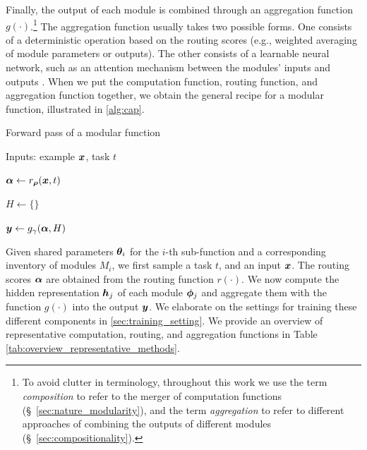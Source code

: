 \documentclass[10pt]{article} %
\begin{document}
Finally, the output of each module is combined through an aggregation function $g(\cdot)$.\footnote{To avoid clutter in terminology, throughout this work we use the term \textit{composition} to refer to the merger of computation functions (\S~\ref{sec:nature_modularity}), and the term \textit{aggregation} to refer to different approaches of combining the outputs of different modules (\S~\ref{sec:compositionality}).} The aggregation function usually takes two possible forms. One consists of a deterministic operation based on the routing scores (e.g., weighted averaging of module parameters or outputs). The other consists of a learnable neural network, such as an attention mechanism between the modules' inputs and outputs \citep{pfeiffer2020adapterfusion}. When we put the computation function, routing function, and aggregation function together, we obtain the general recipe for a modular function, illustrated in \cref{alg:cap}.

\begin{center}
\begin{minipage}{.5\linewidth}
\begin{algorithm}[H]
\caption{Forward pass of a modular function}\label{alg:cap}
Inputs: example ${\bm{x}}$, task $t$

${\bm{\alpha}} \gets r_{\bm{\rho}}({\bm{x}}, t)$ 

$H \gets \{\}$


${\bm{y}} \gets g_\gamma({\bm{\alpha}}, H)$ 

\end{algorithm}
\end{minipage}
\end{center}

Given shared parameters ${\bm{\theta}}_i$ for the $i$-th sub-function and a corresponding inventory of modules $M_i$, we first sample a task $t$, and an input ${\bm{x}}$. The routing scores ${\bm{\alpha}}$ are obtained from the routing function $r(\cdot)$. We now compute the hidden representation ${\bm{h}}_j$ of each module ${\bm{\phi}}_j$ and aggregate them with the function $g(\cdot)$ into the output ${\bm{y}}$. We elaborate on the settings for training these different components in \cref{sec:training_setting}. We provide an overview of representative computation, routing, and aggregation functions in Table \ref{tab:overview_representative_methods}.
\end{document}
